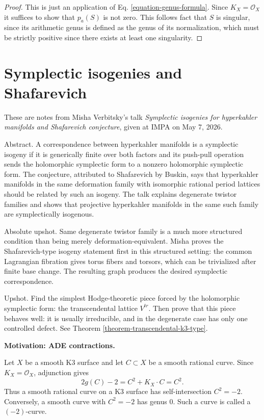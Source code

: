 \documentclass{book}
\begin{document}
\begin{proof}
This is just an application of Eq.
\ref{equation-genus-formula}. Since
$K_X=\mathcal{O}_X$ it suffices to show that
$p_a(S)$ is not zero. This follows
fact that $S$ is singular, since its
arithmetic genus is defined as the genus of
its normalization, which must be strictly
positive since there exists at least
one singularity.
\end{proof}


\section{Symplectic isogenies and
Shafarevich}
\label{section-symplectic-isogenies-shaf}

These are notes from Misha Verbitsky's talk
{\it Symplectic isogenies for hyperkahler
manifolds and Shafarevich conjecture},
given at IMPA on May 7, 2026.

\medskip
Abstract.
A correspondence between hyperkahler
manifolds is a symplectic isogeny if it is
generically finite over both factors and its
push-pull operation sends the holomorphic
symplectic form to a nonzero holomorphic
symplectic form.
The conjecture, attributed to Shafarevich by
Buskin, says that hyperkahler manifolds in
the same deformation family with isomorphic
rational period lattices should be related
by such an isogeny.
The talk explains degenerate twistor
families and shows that projective
hyperkahler manifolds in the same such
family are symplectically isogenous.

\medskip
Absolute upshot.
Same degenerate twistor family is a much
more structured condition than being merely
deformation-equivalent.
Misha proves the Shafarevich-type isogeny
statement first in this structured setting:
the common Lagrangian fibration gives torus
fibers and torsors, which can be trivialized
after finite base change.
The resulting graph produces the desired
symplectic correspondence.

\medskip
Upshot.
Find the simplest Hodge-theoretic piece
forced by the holomorphic symplectic form:
the transcendental lattice $V^{tr}$.
Then prove that this piece behaves well:
it is usually irreducible, and in the
degenerate case has only one controlled
defect.
See Theorem
\ref{theorem-transcendental-k3-type}.

\medskip
{\bf Motivation: ADE contractions.}

Let $X$ be a smooth K3 surface and let
$C \subset X$ be a smooth rational curve.
Since $K_X=\mathcal{O}_X$, adjunction gives
$$
2g(C)-2=C^2+K_X\cdot C=C^2.
$$
Thus a smooth rational curve on a K3 surface
has self-intersection $C^2=-2$.
Conversely, a smooth curve with $C^2=-2$
has genus $0$.
Such a curve is called a $(-2)$-curve.
\end{document}
